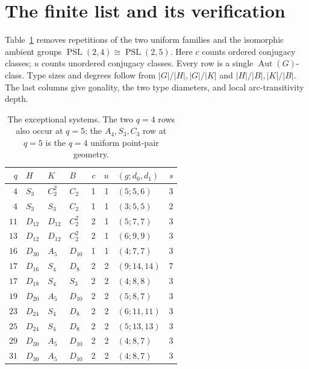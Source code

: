 \documentclass[11pt,a4paper]{article}
\newcommand{\PSL}{\operatorname{PSL}}\newcommand{\PGL}{\operatorname{PGL}}
\newcommand{\Aut}{\operatorname{Aut}}\newcommand{\F}{\mathbb F}
\begin{document}
\section{The finite list and its verification}
Table~\ref{finite} removes repetitions of the two uniform families and the
isomorphic ambient groups $\PSL(2,4)\cong\PSL(2,5)$. Here $c$ counts
ordered conjugacy classes; $u$ counts unordered conjugacy classes. Every row
is a single $\Aut(G)$-class. Type sizes and degrees follow from
$|G|/|H|,|G|/|K|$ and $|H|/|B|,|K|/|B|$. The last columns give
gonality, the two type diameters, and local arc-transitivity depth.
\begin{table}[ht]
\centering\small
\begin{tabular}{rlllrrlr}
\toprule
$q$&$H$&$K$&$B$&$c$&$u$&$(g;d_0,d_1)$&$s$\\\midrule
$4$&$S_3$&$C_2^2$&$C_2$&1&1&$(5;5,6)$&3\\
$4$&$S_3$&$S_3$&$C_2$&1&1&$(3;5,5)$&2\\
$11$&$D_{12}$&$D_{12}$&$C_2^2$&2&1&$(5;7,7)$&3\\
$13$&$D_{12}$&$D_{12}$&$C_2^2$&2&1&$(6;9,9)$&3\\
$16$&$D_{30}$&$A_5$&$D_{10}$&1&1&$(4;7,7)$&3\\
$17$&$D_{16}$&$S_4$&$D_8$&2&2&$(9;14,14)$&7\\
$17$&$D_{18}$&$S_4$&$S_3$&2&2&$(4;8,8)$&3\\
$19$&$D_{20}$&$A_5$&$D_{10}$&2&2&$(5;8,7)$&3\\
$23$&$D_{24}$&$S_4$&$D_8$&2&2&$(6;11,11)$&3\\
$25$&$D_{24}$&$S_4$&$D_8$&2&2&$(5;13,13)$&3\\
$29$&$D_{30}$&$A_5$&$D_{10}$&2&2&$(4;8,7)$&3\\
$31$&$D_{30}$&$A_5$&$D_{10}$&2&2&$(4;8,7)$&3\\
\bottomrule
\end{tabular}
\caption{The exceptional systems. The two $q=4$ rows also occur at $q=5$;
the $A_4,S_3,C_3$ row at $q=5$ is the $q=4$ uniform point-pair geometry.}
\label{finite}\end{table}
\end{document}
